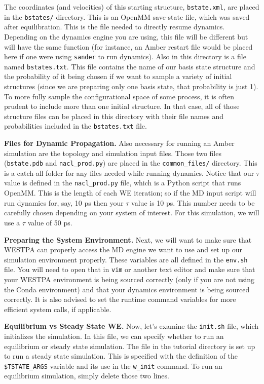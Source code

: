The coordinates (and velocities) of this starting structure, \verb|bstate.xml|, are placed in the \verb|bstates/| directory. 
This is an OpenMM save-state file, which was saved after equilibration.  
This is the file needed to directly resume dynamics.  
Depending on the dynamics engine you are using, this file will be different but will have the same function (for instance, an Amber restart file would be placed here if one were using \verb|sander| to run dynamics).
Also in this directory is a file named \verb|bstates.txt|. 
This file contains the name of our basis state structure and the probability of it being chosen if we want to sample a variety of initial structures (since we are preparing only one basis state, that probability is just 1). 
To more fully sample the configurational space of some process, it is often prudent to include more than one initial structure. 
In that case, all of those structure files can be placed in this directory with their file names and probabilities included in the \verb|bstates.txt| file.

\textbf{Files for Dynamic Propagation.} Also necessary for running an Amber simulation are the topology and simulation input files. 
Those two files (\verb|bstate.pdb| and \verb|nacl_prod.py|) are placed in the \verb|common_files/| directory. 
This is a catch-all folder for any files needed while running dynamics. 
Notice that our $\tau$ value is defined in the \verb|nacl_prod.py| file, which is a Python script that runs OpenMM.  
This is the length of each WE iteration; so if the MD input script will run dynamics for, say, 10 ps then your $\tau$ value is 10 ps. 
This number needs to be carefully chosen depending on your system of interest. 
For this simulation, we will use a $\tau$ value of 50 ps. 

\textbf{Preparing the System Environment.} Next, we will want to make sure that WESTPA can properly access the MD engine we want to use and set up our simulation environment properly. 
These variables are all defined in the \verb|env.sh| file. 
You will need to open that in \verb|vim| or another text editor and make sure that your WESTPA environment is being sourced correctly (only if you are not using the Conda environment) and that your dynamics environment is being sourced correctly. 
It is also advised to set the runtime command variables for more efficient system calls, if applicable.

\textbf{Equilibrium vs Steady State WE.} Now, let’s examine the \verb|init.sh| file, which initializes the simulation. 
In this file, we can specify whether to run an equilibrium or steady state simulation. 
The file in the tutorial directory is set up to run a steady state simulation. 
This is specified with the definition of the \verb|$TSTATE_ARGS| variable and its use in the \verb|w_init| command. 
To run an equilibrium simulation, simply delete those two lines.

